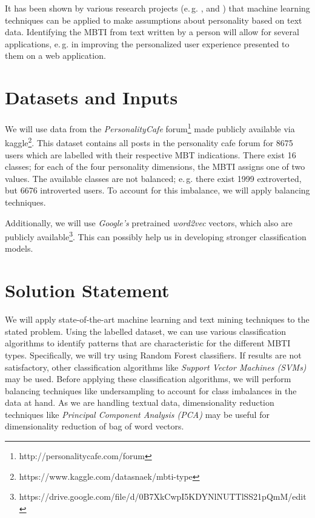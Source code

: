 \documentclass[12pt]{elsarticle}
\begin{document}
It has been shown by various research projects (e.\,g. \cite{golbeck}, \cite{dutch} and \cite{dl}) that machine learning techniques can be applied to make assumptions about personality based on text data. Identifying the MBTI from text written by a person will allow for several applications, e.\,g. in improving the personalized user experience presented to them on a web application.




\section{Datasets and Inputs}
We will use data from the \textit{PersonalityCafe} forum\footnote{http://personalitycafe.com/forum} made publicly available via kaggle\footnote{https://www.kaggle.com/datasnaek/mbti-type}. This dataset contains all posts in the personality cafe forum for 8675 users which are labelled with their respective MBT indications. There exist 16 classes; for each of the four personality dimensions, the MBTI assigns one of two values. The available classes are not balanced; e.\,g. there exist 1999 extroverted, but 6676 introverted users. To account for this imbalance, we will apply balancing techniques. 



Additionally, we will use \textit{Google's} pretrained \textit{word2vec} \cite{w2v} vectors, which also are publicly available\footnote{https://drive.google.com/file/d/0B7XkCwpI5KDYNlNUTTlSS21pQmM/edit}. This can possibly help us in developing stronger classification models. 


\section{Solution Statement}
We will apply state-of-the-art machine learning and text mining techniques to the stated problem. Using the labelled dataset, we can use various classification algorithms to identify patterns that are characteristic for the different MBTI types. Specifically, we will try using Random Forest classifiers. If results are not satisfactory, other classification algorithms like \textit{Support Vector Machines (SVMs)} may be used. Before applying these classification algorithms, we will perform balancing techniques like undersampling to account for class imbalances in the data at hand. As we are handling textual data, dimensionality reduction techniques like \textit{Principal Component Analysis (PCA)} may be useful for dimensionality reduction of bag of word vectors.
\end{document}
